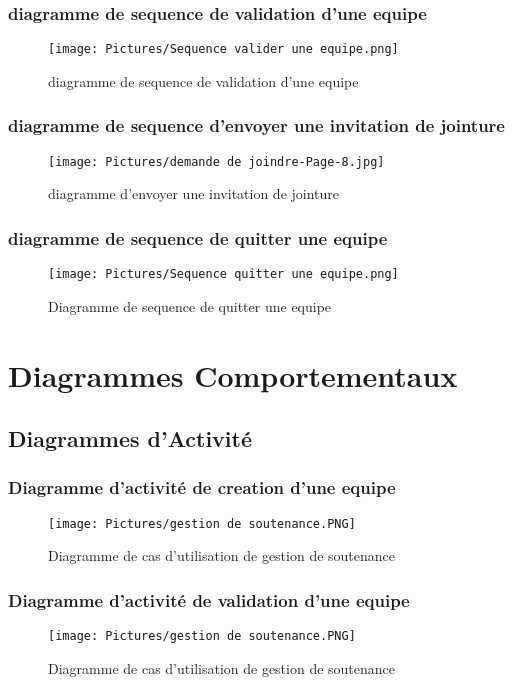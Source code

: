 \documentclass[11pt,fleqn]{book} %
\begin{document}
\subsubsection{diagramme de sequence de validation d'une equipe}
\begin{figure}[h]
    \centering
    \texttt{[image: Pictures/Sequence valider une equipe.png]}
    \caption{diagramme de sequence de validation d'une equipe}
    \label{fig:pca}
\end{figure}
\newpage
\subsubsection{diagramme de sequence d'envoyer une invitation de jointure}
\begin{figure}[h]
    \centering
    \texttt{[image: Pictures/demande de joindre-Page-8.jpg]}
    \caption{diagramme d'envoyer une invitation de jointure}
    \label{fig:pca}
\end{figure}
\newpage
\subsubsection{diagramme de sequence de quitter une equipe}
\begin{figure}[h]
    \centering
    \texttt{[image: Pictures/Sequence quitter une equipe.png]}
    \caption{Diagramme de sequence de quitter une equipe}
    \label{fig:pca}
\end{figure}
\newpage
\section{Diagrammes Comportementaux}
\subsection{Diagrammes d’Activité}
\subsubsection{Diagramme d'activité de creation d'une equipe}
\begin{figure}[h]
    \centering
    \texttt{[image: Pictures/gestion de soutenance.PNG]}
    \caption{Diagramme de cas d'utilisation de gestion de soutenance}
    \label{fig:pca}
\end{figure}
\newpage
\subsubsection{Diagramme d'activité de validation d'une equipe}
\begin{figure}[h]
    \centering
    \texttt{[image: Pictures/gestion de soutenance.PNG]}
    \caption{Diagramme de cas d'utilisation de gestion de soutenance}
    \label{fig:pca}
\end{figure}
\newpage
\end{document}
